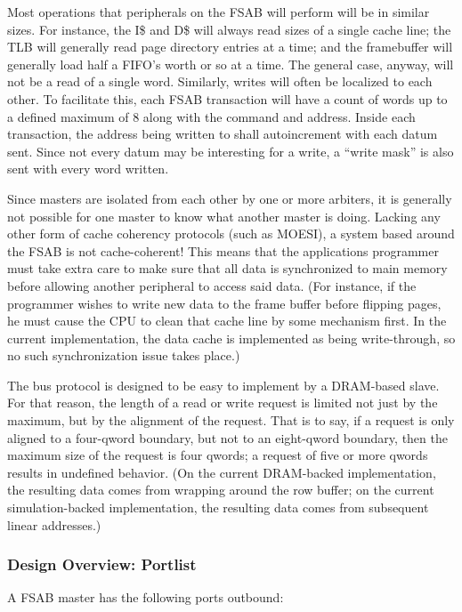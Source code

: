 \documentclass[10pt]{report}
\begin{document}
Most operations that peripherals on the FSAB will perform will be in similar 
sizes. For instance, the I\$ and D\$ will always read sizes of a single cache 
line; the TLB will generally read page directory entries at a time; and the 
framebuffer will generally load half a FIFO's worth or so at a time. The 
general case, anyway, will not be a read of a single word. Similarly, writes 
will often be localized to each other. To facilitate this, each FSAB 
transaction will have a count of words up to a defined maximum of 8 along with 
the command and address. Inside each transaction, the address being written to 
shall autoincrement with each datum sent. Since not every datum may be 
interesting for a write, a ``write mask'' is also sent with every word written.

Since masters are isolated from each other by one or more arbiters, it is
generally not possible for one master to know what another master is doing.
Lacking any other form of cache coherency protocols (such as MOESI), a
system based around the FSAB is not cache-coherent! This means that the
applications programmer must take extra care to make sure that all data is
synchronized to main memory before allowing another peripheral to access
said data. (For instance, if the programmer wishes to write new data to the
frame buffer before flipping pages, he must cause the CPU to clean that
cache line by some mechanism first. In the current implementation, the data
cache is implemented as being write-through, so no such synchronization
issue takes place.)

The bus protocol is designed to be easy to implement by a DRAM-based slave. 
For that reason, the length of a read or write request is limited not just by 
the maximum, but by the alignment of the request. That is to say, if a request 
is only aligned to a four-qword boundary, but not to an eight-qword boundary, 
then the maximum size of the request is four qwords; a request of five or more 
qwords results in undefined behavior. (On the current DRAM-backed 
implementation, the resulting data comes from wrapping around the row buffer; 
on the current simulation-backed implementation, the resulting data comes from 
subsequent linear addresses.) 

\subsubsection{Design Overview: Portlist}

A FSAB master has the following ports outbound:
\end{document}

